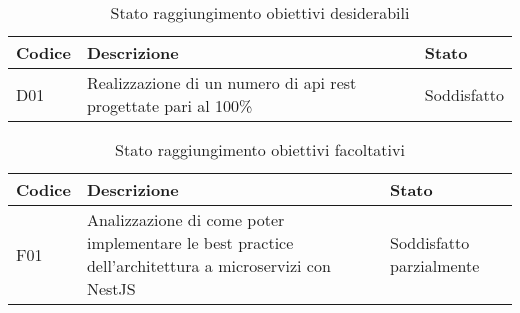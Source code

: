 \clearpage
\begin{table}[H]
    \begin{tabular}{|p{1.5cm}|p{7.7cm}|p{2cm}|} 
    \hline
    \textbf{Codice} & \textbf{Descrizione} & \textbf{Stato} \\ 
    \hline
    D01 & Realizzazione di un numero di \gls{api} \gls{rest} progettate pari al 100\%  & Soddisfatto \\
    \hline
    \end{tabular}
    \caption{Stato raggiungimento obiettivi desiderabili}
\end{table}
\begin{table}[H]
    \begin{tabular}{|p{1.5cm}|p{7.7cm}|p{2cm}|} 
    \hline
    \textbf{Codice} & \textbf{Descrizione} & \textbf{Stato} \\ 
    \hline
    F01 & Analizzazione di come poter implementare le best practice dell'architettura a microservizi con NestJS & Soddisfatto parzialmente \\
    \hline
    \end{tabular}
    \caption{Stato raggiungimento obiettivi facoltativi}
\end{table}

